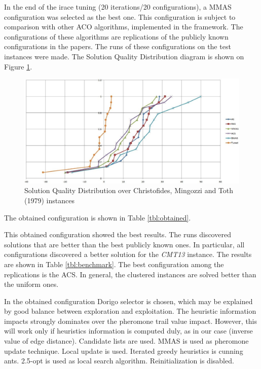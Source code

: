\documentclass[11pt,a4paper,oneside]{book}
\begin{document}
In the end of the irace tuning (20 iterations/20 configurations), a MMAS configuration was selected as the best one. This configuration is subject to comparison with other ACO algorithms, implemented in the framework. The configurations of these algorithms are replications of the publicly known configurations in the papers. The runs of these configurations on the test instances were made. The Solution Quality Distribution diagram is shown on Figure \ref{fig:sqd-cmt}.

\begin{figure}[h]
  \centering
    \includegraphics[scale=0.55]{sqd-benchmark.jpg}
  \caption{Solution Quality Distribution over Christofides, Mingozzi and Toth (1979) instances}
  \label{fig:sqd-cmt}
\end{figure}

The obtained configuration is shown in Table \ref{tbl:obtained}.

This obtained configuration showed the best results. The runs discovered solutions that are better than the best publicly known ones. In particular, all configurations discovered a better solution for the \textit{CMT13} instance. The results are shown in Table \ref{tbl:benchmark}. The best configuration among the replications is the ACS. In general, the clustered instances are solved better than the uniform ones.

In the obtained configuration Dorigo selector is chosen, which may be explained by good balance between exploration and exploitation. The heuristic information impacts strongly dominates over the pheromone trail value impact. However, this will work only if heuristics information is computed duly, as in our case (inverse value of edge distance). Candidate lists are used. MMAS is used as pheromone update technique. Local update is used. Iterated greedy heuristics is cunning ants. 2.5-opt is used as local search algorithm. Reinitialization is disabled.
\end{document}
